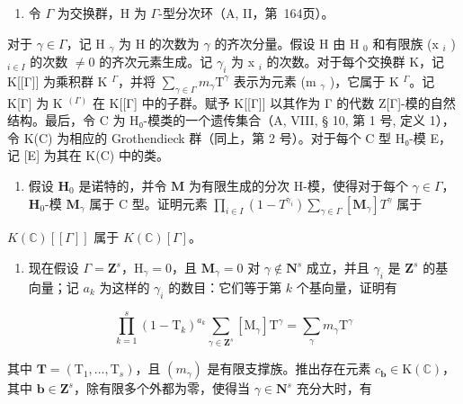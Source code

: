 
\begin{enumerate}
\def\labelenumi{\arabic{enumi})}
\tightlist
\item
  令 \(\Gamma\) 为交换群，H 为 \(\Gamma\)-型分次环（A, II，第~164页）。
\end{enumerate}

对于 \(\gamma\in\Gamma\)，记 H \(_{\gamma}\) 为 H 的次数为 \(\gamma\) 的齐次分量。假设 H 由 H \(_{0}\) 和有限族 (x \(_{i}\) ) \(_{i\in I}\) 的次数 \(\neq0\) 的齐次元素生成。记 \(\gamma_{i}\) 为 x \(_{i}\) 的次数。对于每个交换群 K，记 K{[}{[}Γ{]}{]} 为乘积群 K \(^{\Gamma}\)，并将 \(\sum_{\gamma\in\Gamma}m_{\gamma}\text{T}^{\gamma}\) 表示为元素 (m \(_{\gamma}\) )，它属于 K \(^{\Gamma}\)。记 K{[}Γ{]} 为 K \(^{(\Gamma)}\) 在 K{[}{[}Γ{]} 中的子群。赋予 K{[}{[}Γ{]}{]} 以其作为 Γ 的代数 Z{[}Γ{]}-模的自然结构。最后，令 C 为 H₀-模类的一个遗传集合（A, VIII, § 10, 第 1 号, 定义 1），令 K(C) 为相应的 Grothendieck 群（同上，第 2 号）。对于每个 C 型 H₀-模 E，记 {[}E{]} 为其在 K(C) 中的类。

\begin{enumerate}
\def\labelenumi{\alph{enumi})}
\tightlist
\item
  假设 \(\mathbf{H}_0\) 是诺特的，并令 \(\mathbf{M}\) 为有限生成的分次 H-模，使得对于每个 \(\gamma \in \Gamma\)，\(\mathbf{H}_0\)-模 \(\mathbf{M}_{\gamma}\) 属于 C 型。证明元素 \(\prod_{i \in I} (1 - T^{\gamma_i}) \sum_{\gamma \in \Gamma} [\mathbf{M}_{\gamma}] T^{\gamma}\) 属于
\end{enumerate}

\(K(\mathbb{C})[[\Gamma]]\) 属于 \(K(\mathbb{C})[\Gamma]\)。

\begin{enumerate}
\def\labelenumi{\alph{enumi})}
\setcounter{enumi}{1}
\tightlist
\item
  现在假设 \(\Gamma = \mathbf{Z}^s\)，\(\mathrm{H}_{\gamma} = 0\)，且 \(\mathbf{M}_{\gamma} = 0\) 对 \(\gamma \notin \mathbf{N}^s\) 成立，并且 \(\gamma_i\) 是 \(\mathbf{Z}^s\) 的基向量；记 \(a_k\) 为这样的 \(\gamma_i\) 的数目：它们等于第 \(k\) 个基向量，证明有
\end{enumerate}

\[
\prod_ {k = 1} ^ {s} (1 - \mathrm{T} _ {k}) ^ {a _ {k}} \sum_ {\gamma \in \mathbf {Z} ^ {s}} [ \mathrm{M} _ {\gamma} ] \mathrm{T} ^ {\gamma} = \sum_ {\gamma} m _ {\gamma} \mathrm{T} ^ {\gamma}
\]

其中 \(\mathbf{T} = (\mathrm{T}_{1},\dots,\mathrm{T}_{s})\)，且 \((m_{\gamma})\) 是有限支撑族。推出存在元素 \(c_{\boldsymbol{b}}\in\mathrm{K}(\mathbb{C})\)，其中 \(\boldsymbol{b}\in\mathbf{Z}^{s}\)，除有限多个外都为零，使得当 \(\gamma\in\mathbf{N}^{s}\) 充分大时，有

